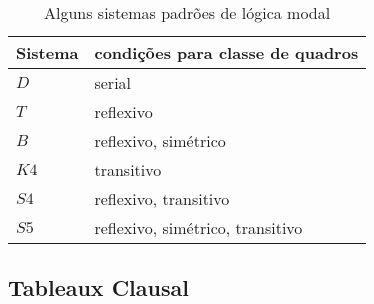 \begin{table}
    \begin{center}
        \label{table:condicoes_quadro}
        \caption{Alguns sistemas padrões de lógica modal}
        \begin{tabular}{ll}
            \hline
            Sistema & condições para classe de quadros \\
            \hline
            $D$  & serial \\ 
            $T$  & reflexivo \\ 
            $B$  & reflexivo, simétrico\\ 
            $K4$ & transitivo \\  
            $S4$ & reflexivo, transitivo \\  
            $S5$ & reflexivo, simétrico, transitivo \\
            \hline
        \end{tabular}
    \end{center}
\end{table}
\subsection{Tableaux Clausal}



